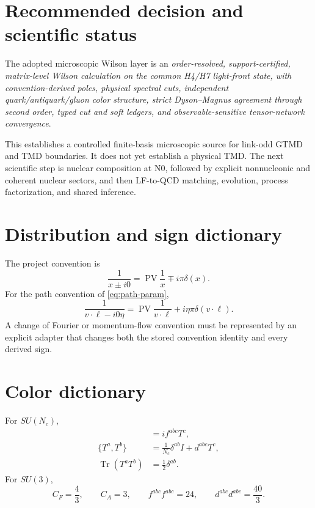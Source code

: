 \documentclass[11pt]{article}
\newcommand{\Tr}{\operatorname{Tr}}
\newcommand{\PV}{\operatorname{PV}}
\begin{document}
\section{Recommended decision and scientific status}
\label{sec:decision}

The adopted microscopic Wilson layer is an
\emph{order-resolved, support-certified, matrix-level Wilson calculation on
the common H4/H7 light-front state, with convention-derived poles, physical
spectral cuts, independent quark/antiquark/gluon color structure, strict
Dyson--Magnus agreement through second order, typed cut and soft ledgers, and
observable-sensitive tensor-network convergence}.

This establishes a controlled finite-basis microscopic source for link-odd
GTMD and TMD boundaries.  It does not yet establish a physical TMD.  The next
scientific step is nuclear composition at N0, followed by explicit nonnucleonic
and coherent nuclear sectors, and then LF-to-QCD matching, evolution, process
factorization, and shared inference.

\appendix

\section{Distribution and sign dictionary}
\label{app:signs}

The project convention is
\begin{equation}
 \frac{1}{x\pm i0}
 =\PV\frac1x\mp i\pi\delta(x).
\end{equation}
For the path convention of \cref{eq:path-param},
\begin{equation}
 \frac{1}{v\cdot\ell-i0\eta}
 =\PV\frac{1}{v\cdot\ell}
 +i\eta\pi\delta(v\cdot\ell).
\end{equation}
A change of Fourier or momentum-flow convention must be represented by an
explicit adapter that changes both the stored convention identity and every
derived sign.

\section{Color dictionary}
\label{app:color}

For \(SU(N_c)\),
\begin{align}
 [T^a,T^b]&=if^{abc}T^c,\\
 \{T^a,T^b\}&=\frac1{N_c}\delta^{ab}I+d^{abc}T^c,\\
 \Tr(T^aT^b)&=\frac12\delta^{ab}.
\end{align}
For \(SU(3)\),
\begin{equation}
 C_F=\frac43,
 \qquad C_A=3,
 \qquad f^{abc}f^{abc}=24,
 \qquad d^{abc}d^{abc}=\frac{40}{3}.
\end{equation}
\end{document}
